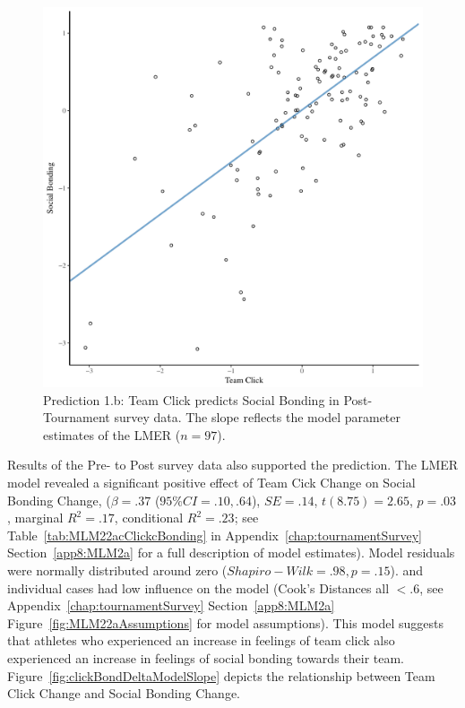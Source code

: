 \begin{CJK}{UTF8}{gbsn}
  \begin{figure}[htbp]
    \centering
  \includegraphics[scale=.5]{images/clickBondModelSlope.pdf}
    \caption{Prediction 1.b: Team Click predicts Social Bonding in Post-Tournament survey data. The slope reflects the model parameter estimates of the LMER ($n = 97$).}
    \label{fig:clickBondModelSlope}
  \end{figure}



Results of the Pre- to Post survey data also supported the prediction.
The LMER model revealed a significant positive effect of Team Cick Change on Social Bonding Change, ($\beta = .37$ ($95\% CI =  .10, .64$), $SE = .14$, $t(8.75) = 2.65$, $p = .03$, marginal $R^2 = .17$, conditional $R^2 = .23$; see Table~\ref{tab:MLM22acClickcBonding} in Appendix~\ref{chap:tournamentSurvey} Section~\ref{app8:MLM2a} for a full description of model estimates).  Model residuals were normally distributed around zero ($Shapiro-Wilk = .98, p = .15$). and individual cases had low influence on the model (Cook's Distances all $< .6$, see Appendix~\ref{chap:tournamentSurvey} Section~\ref{app8:MLM2a} Figure~\ref{fig:MLM22aAssumptions} for model assumptions).  This model suggests that athletes who experienced an increase in feelings of team click also experienced an increase in feelings of social bonding towards their team.
Figure~\ref{fig:clickBondDeltaModelSlope} depicts the relationship between Team Click Change and Social Bonding Change.



\end{CJK}
